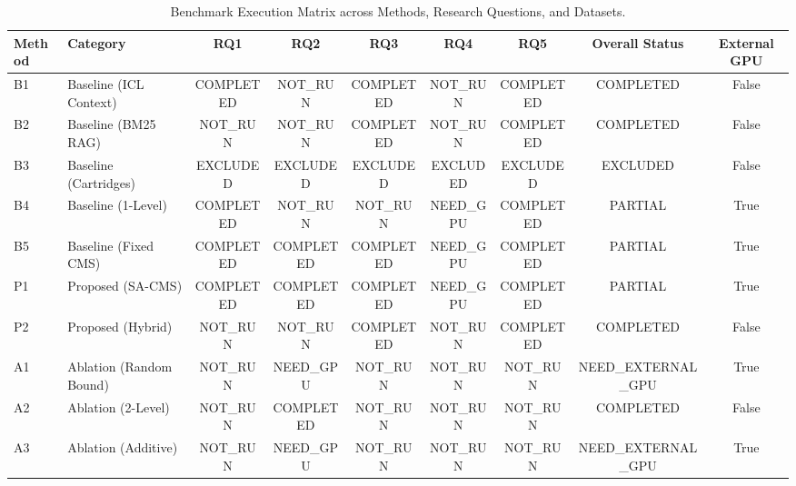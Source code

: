\begin{table}[t]
\centering
\small
\caption{Benchmark Execution Matrix across Methods, Research Questions, and Datasets.}
\label{tab:benchmark_status}
\begin{tabular}{llccccccc}
\toprule
\textbf{Method} & \textbf{Category} & \textbf{RQ1} & \textbf{RQ2} & \textbf{RQ3} & \textbf{RQ4} & \textbf{RQ5} & \textbf{Overall Status} & \textbf{External GPU} \\
\midrule
B1 & Baseline (ICL Context) & COMPLETED & NOT\_RUN & COMPLETED & NOT\_RUN & COMPLETED & COMPLETED & False \\
B2 & Baseline (BM25 RAG)    & NOT\_RUN  & NOT\_RUN & COMPLETED & NOT\_RUN & COMPLETED & COMPLETED & False \\
B3 & Baseline (Cartridges)  & EXCLUDED  & EXCLUDED & EXCLUDED  & EXCLUDED & EXCLUDED  & EXCLUDED  & False \\
B4 & Baseline (1-Level)     & COMPLETED & NOT\_RUN & NOT\_RUN  & NEED\_GPU& COMPLETED & PARTIAL   & True \\
B5 & Baseline (Fixed CMS)   & COMPLETED & COMPLETED& COMPLETED & NEED\_GPU& COMPLETED & PARTIAL   & True \\
P1 & Proposed (SA-CMS)      & COMPLETED & COMPLETED& COMPLETED & NEED\_GPU& COMPLETED & PARTIAL   & True \\
P2 & Proposed (Hybrid)      & NOT\_RUN  & NOT\_RUN & COMPLETED & NOT\_RUN & COMPLETED & COMPLETED & False \\
\midrule
A1 & Ablation (Random Bound)& NOT\_RUN  & NEED\_GPU& NOT\_RUN  & NOT\_RUN & NOT\_RUN  & NEED\_EXTERNAL\_GPU & True \\
A2 & Ablation (2-Level)     & NOT\_RUN  & COMPLETED& NOT\_RUN  & NOT\_RUN & NOT\_RUN  & COMPLETED & False \\
A3 & Ablation (Additive)    & NOT\_RUN  & NEED\_GPU& NOT\_RUN  & NOT\_RUN & NOT\_RUN  & NEED\_EXTERNAL\_GPU & True \\
\bottomrule
\end{tabular}
\end{table}
